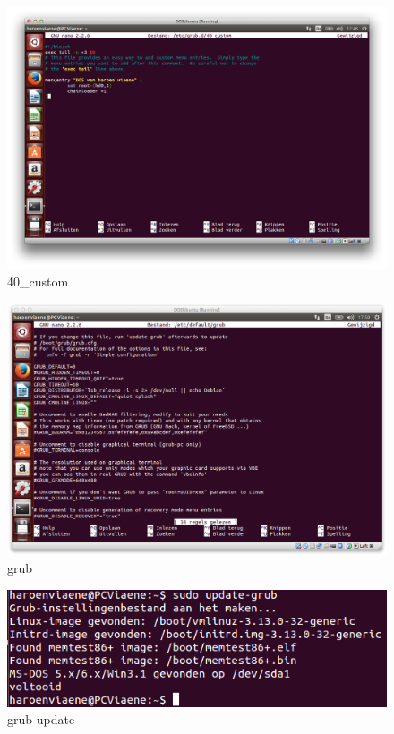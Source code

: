 \documentclass[11pt, a4paper]{article}
\begin{document}
\begin{figure}[H]
	\centering
	\includegraphics[width=\textwidth]{./IMG/ZC}
	\caption{40\_custom}
\end{figure}

\begin{figure}[H]
	\centering
	\includegraphics[width=\textwidth]{./IMG/ZD}
	\caption{grub}
\end{figure}

\begin{figure}[H]
	\centering
	\includegraphics[width=\textwidth]{./IMG/ZE}
	\caption{grub-update}
\end{figure}
\end{document}
